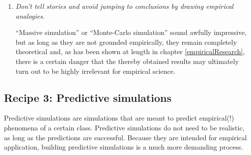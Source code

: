 \begin{enumerate}
\item {\em Don't tell stories and avoid jumping to conclusions by drawing
    empirical analogies.}

  ``Massive simulation'' or ``Monte-Carlo simulation'' sound
  awfully impressive, but as long as they are not grounded empirically, they
  remain completely theoretical and, as has been shown at length in chapter
  \ref{empiricalResearch}, there is a certain danger that the thereby obtained 
  results may ultimately turn out to be highly irrelevant for empirical science.

\end{enumerate}


\subsection{Recipe 3: Predictive simulations}
\label{recipePrediction}
Predictive simulations are simulations that are meant to predict empirical(!)
phenomena of a certain class. Predictive simulations do not need to be
realistic, as long as the predictions are successful. Because they are
intended for empirical application, building predictive simulations is a much
more demanding process.


